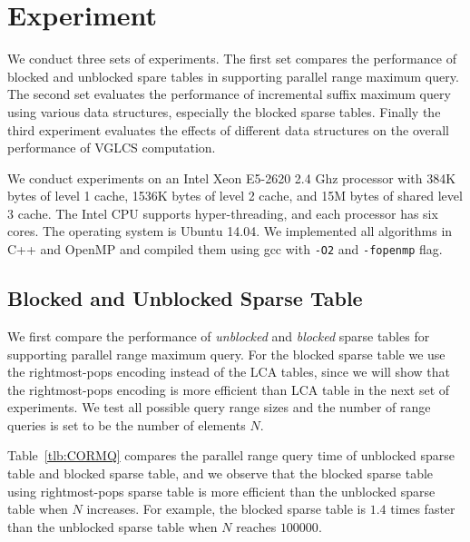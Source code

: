 \section{Experiment} \label{sec:Experiment}

We conduct three sets of experiments.  The first set compares the
performance of blocked and unblocked spare tables in supporting
parallel range maximum query.  The second set evaluates the
performance of incremental suffix maximum query using various data
structures, especially the blocked sparse tables.  Finally the third
experiment evaluates the effects of different data structures on the
overall performance of VGLCS computation.

We conduct experiments on an Intel Xeon E5-2620 2.4 Ghz processor with
384K bytes of level 1 cache, 1536K bytes of level 2 cache, and 15M
bytes of shared level 3 cache.  The Intel CPU supports
hyper-threading, and each processor has six cores.  The operating
system is Ubuntu 14.04.  We implemented all algorithms in C++ and
OpenMP and compiled them using gcc with {\tt -O2} and {\tt -fopenmp}
flag.

\subsection{Blocked and Unblocked Sparse Table}

We first compare the performance of {\em unblocked} and {\em blocked}
sparse tables for supporting parallel range maximum query.  For the
blocked sparse table we use the rightmost-pops encoding instead of the
LCA tables, since we will show that the rightmost-pops encoding is more
efficient than LCA table in the next set of experiments.  We test all
possible query range sizes and the number of range queries is set to be
the number of elements $N$.

Table~\ref{tlb:CORMQ} compares the parallel range query time of
unblocked sparse table and blocked sparse table, and we observe that
the blocked sparse table using rightmost-pops sparse table is more
efficient than the unblocked sparse table when $N$ increases.  For
example, the blocked sparse table is $1.4$ times faster than the
unblocked sparse table when $N$ reaches $100000$. 

